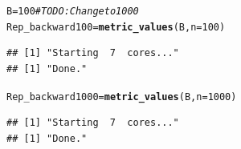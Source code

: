 \documentclass[11pt]{article}\usepackage[]{graphicx}\usepackage[]{color}
\makeatletter
\newcommand{\hlnum}[1]{\textcolor[rgb]{0.686,0.059,0.569}{#1}}%
\newcommand{\hlcom}[1]{\textcolor[rgb]{0.678,0.584,0.686}{\textit{#1}}}%
\newcommand{\hlstd}[1]{\textcolor[rgb]{0.345,0.345,0.345}{#1}}%
\newcommand{\hlkwb}[1]{\textcolor[rgb]{0.69,0.353,0.396}{#1}}%
\newcommand{\hlkwc}[1]{\textcolor[rgb]{0.333,0.667,0.333}{#1}}%
\newcommand{\hlkwd}[1]{\textcolor[rgb]{0.737,0.353,0.396}{\textbf{#1}}}%
\newenvironment{kframe}{%
 \def\at@end@of@kframe{}%
 \ifinner\ifhmode%
  \def\at@end@of@kframe{\end{minipage}}%
  \begin{minipage}{\columnwidth}%
 \fi\fi%
 \def\FrameCommand##1{\hskip\@totalleftmargin \hskip-\fboxsep
 \colorbox{shadecolor}{##1}\hskip-\fboxsep
     \hskip-\linewidth \hskip-\@totalleftmargin \hskip\columnwidth}%
 \MakeFramed {\advance\hsize-\width
   \@totalleftmargin\z@ \linewidth\hsize
   \@setminipage}}%
 {\par\unskip\endMakeFramed%
 \at@end@of@kframe}
\newenvironment{knitrout}{}{} %
\makeatother
\begin{document}
\begin{knitrout}
\begin{kframe}
\begin{alltt}
\hlstd{B} \hlkwb{=} \hlnum{100} \hlcom{# TODO: Change to 1000}
\hlstd{Rep_backward100} \hlkwb{=} \hlkwd{metric_values}\hlstd{(B,}\hlkwc{n}\hlstd{=}\hlnum{100}\hlstd{)}
\end{alltt}
\begin{lstlisting}[basicstyle=\ttfamily,breaklines=true]
## [1] "Starting  7  cores..."
## [1] "Done."
\end{lstlisting}
\begin{alltt}
\hlstd{Rep_backward1000} \hlkwb{=} \hlkwd{metric_values}\hlstd{(B,}\hlkwc{n}\hlstd{=}\hlnum{1000}\hlstd{)}
\end{alltt}
\begin{lstlisting}[basicstyle=\ttfamily,breaklines=true]
## [1] "Starting  7  cores..."
## [1] "Done."
\end{lstlisting}
\end{kframe}
\end{knitrout}
\end{document}
